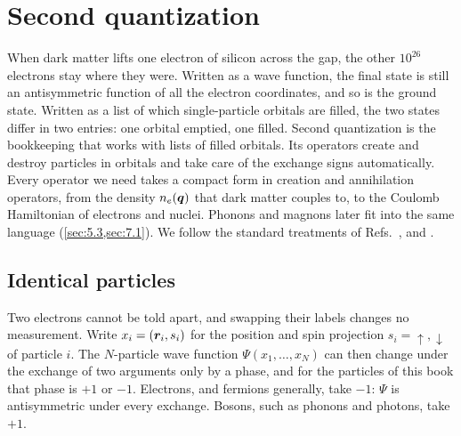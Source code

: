 \section{Second quantization}\label{sec:2.3}

When dark matter lifts one electron of silicon across the gap, the other $10^{26}$ electrons stay where they were. Written as a wave function, the final state is still an antisymmetric function of all the electron coordinates, and so is the ground state. Written as a list of which single-particle orbitals are filled, the two states differ in two entries: one orbital emptied, one filled. Second quantization is the bookkeeping that works with lists of filled orbitals. Its operators create and destroy particles in orbitals and take care of the exchange signs automatically. Every operator we need takes a compact form in creation and annihilation operators, from the density $n_e(\bm{q})$ that dark matter couples to, to the Coulomb Hamiltonian of electrons and nuclei. Phonons and magnons later fit into the same language (\cref{sec:5.3,sec:7.1}). We follow the standard treatments of Refs.~\cite[Chap.~1]{bruus2004many}, \cite[Chap.~1]{fetter1971quantum} and \cite[Chap.~1]{giuliani2005quantum}.

\subsection{Identical particles}

Two electrons cannot be told apart, and swapping their labels changes no measurement. Write $x_i = (\bm{r}_i, s_i)$ for the position and spin projection $s_i = {\uparrow},{\downarrow}$ of particle $i$. The $N$-particle wave function $\Psi(x_1,\dots,x_N)$ can then change under the exchange of two arguments only by a phase, and for the particles of this book that phase is $+1$ or $-1$. Electrons, and fermions generally, take $-1$: $\Psi$ is antisymmetric under every exchange. Bosons, such as phonons and photons, take $+1$.

